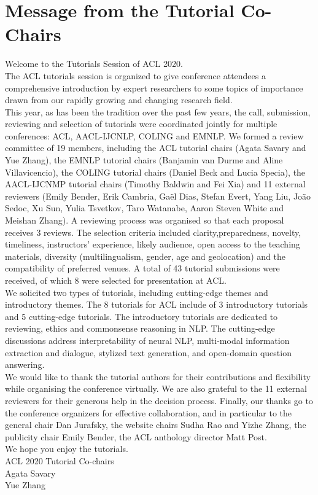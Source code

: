 \section{Message from the Tutorial Co-Chairs}
\vspace*{0.2cm}

Welcome to the Tutorials Session of ACL 2020.\\

The ACL tutorials session is organized to give conference attendees a comprehensive introduction by expert researchers to some topics of importance drawn from our rapidly growing and changing research field.\\
This year, as has been the tradition over the past few years, the call, submission, reviewing and selection of tutorials were coordinated jointly for multiple conferences: ACL, AACL-IJCNLP, COLING and EMNLP.
We formed a review committee of 19 members, including the ACL tutorial chairs (Agata Savary and Yue Zhang), the EMNLP tutorial chairs (Banjamin van Durme and Aline Villavicencio), the COLING tutorial chairs (Daniel Beck and Lucia Specia), the AACL-IJCNMP tutorial chairs (Timothy Baldwin and Fei Xia) and 11 external reviewers (Emily Bender, Erik Cambria, Gaël Dias, Stefan Evert, Yang Liu, João Sedoc, Xu Sun, Yulia Tsvetkov, Taro Watanabe, Aaron Steven White and Meishan Zhang). A reviewing process was organised so that each proposal receives 3 reviews. The selection criteria included clarity,preparedness, novelty, timeliness, instructors’ experience, likely audience, open access to the teaching materials, diversity (multilingualism, gender, age and geolocation) and the compatibility of preferred venues. A total of 43 tutorial submissions were received, of which 8 were selected for presentation at ACL.\\

We solicited two types of tutorials, including cutting-edge themes and introductory themes. The 8 tutorials for ACL include of 3 introductory tutorials and 5 cutting-edge tutorials. The introductory tutorials are dedicated to reviewing, ethics and commonsense reasoning in NLP. The cutting-edge discussions address interpretability of neural NLP, multi-modal information extraction and dialogue, stylized text generation, and open-domain question answering.\\

We would like to thank the tutorial authors for their contributions and flexibility while organising the conference virtually. We are also grateful to the 11 external reviewers for their generous help in the decision process. Finally, our thanks go to the conference organizers for effective collaboration, and in particular to the general chair Dan Jurafsky, the website chairs Sudha Rao and Yizhe Zhang, the publicity chair Emily Bender, the ACL anthology director Matt Post.\\

We hope you enjoy the tutorials.\\

ACL 2020 Tutorial Co-chairs\\
Agata Savary\\
Yue Zhang\\